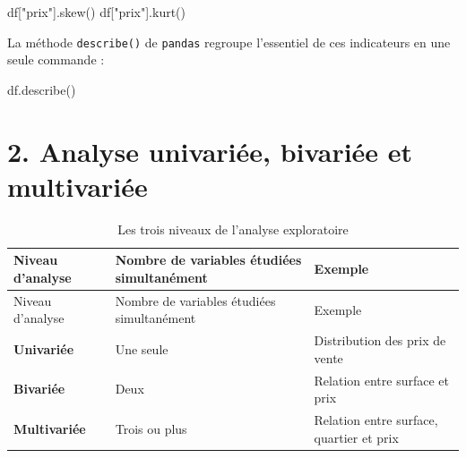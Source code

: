 \documentclass[
  french,
  letterpaper,
  open=any]{scrbook}
\newenvironment{Shaded}{\begin{snugshade}}{\end{snugshade}}
\newcommand{\NormalTok}[1]{\textcolor[rgb]{0.00,0.23,0.31}{#1}}
\newcommand{\StringTok}[1]{\textcolor[rgb]{0.13,0.47,0.30}{#1}}
\theoremstyle{definition}
\theoremstyle{definition}
\theoremstyle{remark}
\begin{document}
\begin{Shaded}
\begin{Highlighting}[]
\NormalTok{df[}\StringTok{"prix"}\NormalTok{].skew()}
\NormalTok{df[}\StringTok{"prix"}\NormalTok{].kurt()}
\end{Highlighting}
\end{Shaded}

La méthode \texttt{describe()} de \texttt{pandas} regroupe l'essentiel
de ces indicateurs en une seule commande :

\begin{Shaded}
\begin{Highlighting}[]
\NormalTok{df.describe()}
\end{Highlighting}
\end{Shaded}

\section{2. Analyse univariée, bivariée et
multivariée}\label{analyse-univariuxe9e-bivariuxe9e-et-multivariuxe9e}

\begin{longtable}[]{@{}
  >{\raggedright\arraybackslash}p{}
  >{\raggedright\arraybackslash}p{}
  >{\raggedright\arraybackslash}p{}@{}}
\caption{Les trois niveaux de l'analyse
exploratoire}\label{tbl-niveaux-analyse}\tabularnewline
\toprule\noalign{}
\begin{minipage}[b]{\linewidth}\raggedright
Niveau d'analyse
\end{minipage} & \begin{minipage}[b]{\linewidth}\raggedright
Nombre de variables étudiées simultanément
\end{minipage} & \begin{minipage}[b]{\linewidth}\raggedright
Exemple
\end{minipage} \\
\midrule\noalign{}
\endfirsthead
\toprule\noalign{}
\begin{minipage}[b]{\linewidth}\raggedright
Niveau d'analyse
\end{minipage} & \begin{minipage}[b]{\linewidth}\raggedright
Nombre de variables étudiées simultanément
\end{minipage} & \begin{minipage}[b]{\linewidth}\raggedright
Exemple
\end{minipage} \\
\midrule\noalign{}
\endhead
\bottomrule\noalign{}
\endlastfoot
\textbf{Univariée} & Une seule & Distribution des prix de vente \\
\textbf{Bivariée} & Deux & Relation entre surface et prix \\
\textbf{Multivariée} & Trois ou plus & Relation entre surface, quartier
et prix \\
\end{longtable}
\end{document}

